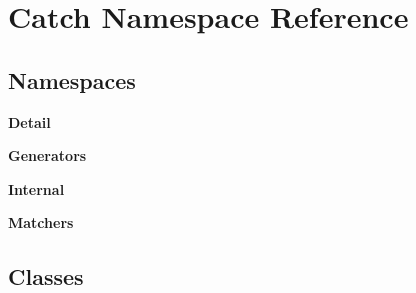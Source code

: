 \section{Catch Namespace Reference}
\label{namespace_catch}
\subsection*{Namespaces}
\begin{DoxyCompactItemize}
\item 
 \textbf{ Detail}
\item 
 \textbf{ Generators}
\item 
 \textbf{ Internal}
\item 
 \textbf{ Matchers}
\end{DoxyCompactItemize}
\subsection*{Classes}
